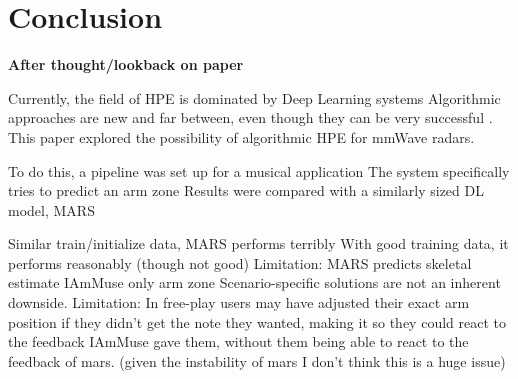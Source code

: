 \chapter{Conclusion}
\label{chapter:conclusion}

\textbf{After thought/lookback on paper}

Currently, the field of HPE is dominated by Deep Learning systems
Algorithmic approaches are new and far between, even though they can be very successful \cite{li2025acoustic}.
This paper explored the possibility of algorithmic HPE for mmWave radars.

To do this, a pipeline was set up for a musical application
The system specifically tries to predict an arm zone
Results were compared with a similarly sized DL model, MARS \cite{an2021mars}

Similar train/initialize data, MARS performs terribly
With good training data, it performs reasonably (though not good)
Limitation: MARS predicts skeletal estimate IAmMuse only arm zone
Scenario-specific solutions are not an inherent downside.
Limitation: In free-play users may have adjusted their exact arm position if they didn't get the note they wanted, making it so they could react to the feedback IAmMuse gave them, without them being able to react to the feedback of mars. (given the instability of mars I don't think this is a huge issue)




% 

% 



